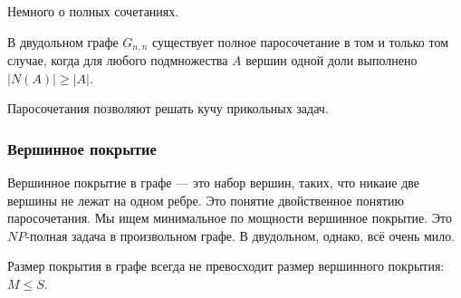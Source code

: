 Немного о полных сочетаниях.
\begin{theorem}
В двудольном графе $G_{n,n}$ существует полное паросочетание в том и только том случае, когда для любого подмножества $A$ вершин одной доли выполнено $|N(A)| \geqslant |A|$. 
\end{theorem}

Паросочетания позволяют решать кучу прикольных задач.

\subsubsection{Вершинное покрытие}
Вершинное покрытие в графе --- это набор вершин, таких, что никаие две вершины не лежат на одном ребре.
Это понятие двойственное понятию паросочетания.
Мы ищем минимальное по мощности вершинное покрытие. 
Это $NP$-полная задача в произвольном графе.
В двудольном, однако, всё очень мило.

Размер покрытия в графе всегда не превосходит размер вершинного покрытия: $M \leqslant S$.

